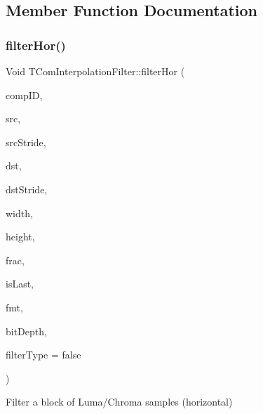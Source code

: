 \subsection{Member Function Documentation}
\mbox{\label{class_t_com_interpolation_filter_a37c22c38efbf42d24b058b3538e13c0e}} 
\subsubsection{\texorpdfstring{filter\+Hor()}{filterHor()}}
{\footnotesize\ttfamily Void T\+Com\+Interpolation\+Filter\+::filter\+Hor (\begin{DoxyParamCaption}\item[{const Component\+ID}]{comp\+ID,  }\item[{\hyperlink{_type_def_8h_af92141699657699b4b547be0c8517541}{Pel} $\ast$}]{src,  }\item[{Int}]{src\+Stride,  }\item[{\hyperlink{_type_def_8h_af92141699657699b4b547be0c8517541}{Pel} $\ast$}]{dst,  }\item[{Int}]{dst\+Stride,  }\item[{Int}]{width,  }\item[{Int}]{height,  }\item[{Int}]{frac,  }\item[{Bool}]{is\+Last,  }\item[{const \hyperlink{_type_def_8h_a4a6c51c10f2eb04abc7209db7caff39f}{Chroma\+Format}}]{fmt,  }\item[{const Int}]{bit\+Depth,  }\item[{Bool}]{filter\+Type = {\ttfamily false} }\end{DoxyParamCaption})}



Filter a block of Luma/\+Chroma samples (horizontal) 


